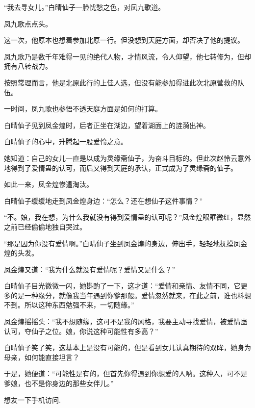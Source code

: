 \begin{this_body}
“我去寻女儿。”白晴仙子一脸忧愁之色，对凤九歌道。

凤九歌点点头。

这一次，他原本也想着参加北原一行。但没想到天庭方面，却否决了他的提议。

凤九歌乃是数千年难得一见的绝代人物，才情风流，令人仰望，他七转修为，但却拥有八转战力。

按照常理而言，他是北原此行的上佳人选，但没有能参加得进此次北原营救的队伍。

一时间，凤九歌也参悟不透天庭方面是如何的打算。

白晴仙子见到凤金煌时，后者正坐在湖边，望着湖面上的涟漪出神。

白晴仙子的心中，升腾起一股爱怜之意。

她知道：自己的女儿一直是以成为灵缘斋仙子，为奋斗目标的。但此次赵怜云意外地得到了爱情蛊的认可，而后又得到天庭的承认，正式成为了灵缘斋的仙子。

如此一来，凤金煌惨遭淘汰。

白晴仙子缓缓地走到凤金煌身边：“怎么？还在想仙子这件事情？”

“不。娘，我在想，为什么我就没有得到爱情蛊的认可呢？”凤金煌眼眶微红，显然之前已经偷偷地独自哭过。

“那是因为你没有爱情啊。”白晴仙子坐到凤金煌的身边，伸出手，轻轻地抚摸凤金煌的头发。

凤金煌又道：“我为什么就没有爱情呢？爱情又是什么？”

白晴仙子目光微微一闪，她斟酌了一下，这才道：“爱情和亲情、友情不同，它更多的是一种缘分，就像我当年遇到你爹那般。爱情忽然就来，在此之前，谁也料想不到。所以这种东西勉强不来，一切随缘。”

凤金煌摇摇头：“我不想随缘，这可不是我的风格，我要主动寻找爱情，被爱情蛊认可，夺仙子之位。娘，你说这种可能性有多高？”

白晴仙子笑了笑，这基本上是没有可能的，但是看到女儿认真期待的双眸，她身为母亲，如何能直接坦言？

于是，她便道：“可能性是有的，但首先你得遇到你想爱的人呐。这种人，可不是爹娘，也不是你身边的那些女伴儿。”

想友一下手机访问.

\end{this_body}


